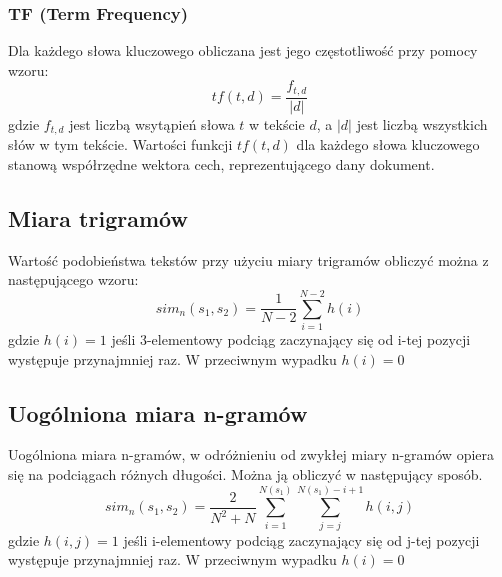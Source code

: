 \documentclass{classrep}
\begin{document}
\subsubsection{TF (Term Frequency)  \cite{TF_TF-IDF}}
Dla każdego słowa kluczowego obliczana jest jego częstotliwość przy pomocy wzoru: 
\begin{equation}
tf(t,d) =  \frac{f_{t,d}}{|d|} 
\end{equation}
gdzie \(f_{t,d}\) jest liczbą wsytąpień słowa \(t\) w tekście \(d\), a \(|d|\) jest liczbą wszystkich słów w tym tekście. Wartości funkcji \(tf(t,d)\) dla każdego słowa kluczowego stanową współrzędne wektora cech, reprezentującego dany dokument.

\subsection{Miara trigramów \cite{ANiewSkrypt}} 
Wartość podobieństwa tekstów przy użyciu miary trigramów obliczyć można z następującego wzoru:
\begin{equation}
sim_{n}(s_{1}, s_{2}) = \frac{1}{N-2}\sum_{i=1}^{N-2}h(i)
\end{equation}
 gdzie \(h(i) = 1\) jeśli 3-elementowy podciąg zaczynający się od i-tej pozycji występuje przynajmniej raz. W przeciwnym wypadku \(h(i) = 0\)
 
 \subsection{Uogólniona miara n-gramów \cite{ANiewSkrypt}} 
 Uogólniona miara n-gramów, w odróżnieniu od zwykłej miary n-gramów opiera się na podciągach różnych długości. Można ją obliczyć w następujący sposób.
 \begin{equation}
 sim_{n}(s_{1}, s_{2}) = \frac{2}{N^2+N}\sum_{i=1}^{N(s_1)}\sum_{j=j}^{N(s_1)-i+1} h(i,j)
 \end{equation}
 gdzie \(h(i,j) = 1\) jeśli i-elementowy podciąg zaczynający się od j-tej pozycji występuje przynajmniej raz. W przeciwnym wypadku \(h(i) = 0\)
\end{document}
